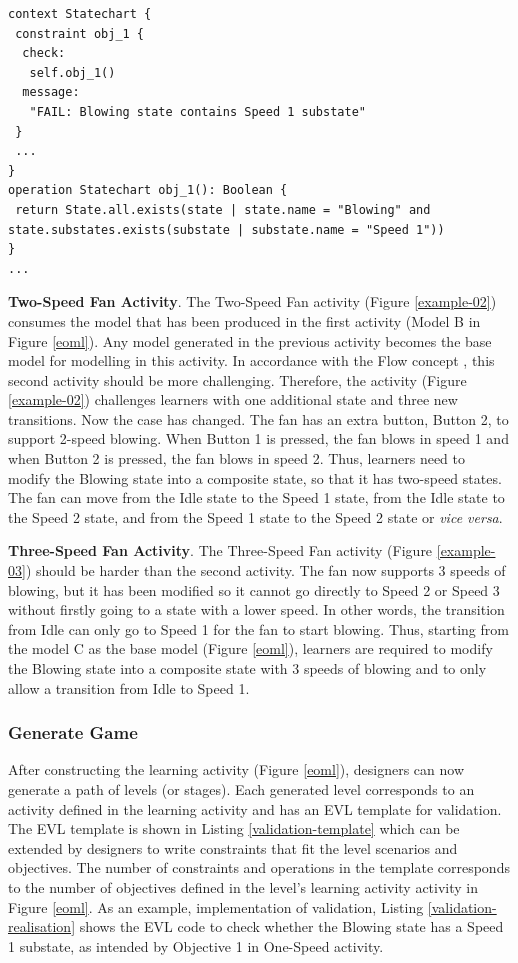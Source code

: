 \documentclass[10pt, a4paper]{report} \usepackage[titletoc]{appendix}
\begin{document}
\begin{lstlisting}[style=interfaces,caption={Validation realisation for Objective 1 in One-Speed Fan activity/level.}, label=validation-realisation]
context Statechart {
 constraint obj_1 {
  check: 
   self.obj_1()
  message:
   "FAIL: Blowing state contains Speed 1 substate"
 }
 ...
}
operation Statechart obj_1(): Boolean {
 return State.all.exists(state | state.name = "Blowing" and state.substates.exists(substate | substate.name = "Speed 1"))
}
...
\end{lstlisting} 

\textbf{Two-Speed Fan Activity}. The Two-Speed Fan activity (Figure \ref{example-02}) consumes the model that has been produced in the first activity (Model B in Figure \ref{eoml}). Any model generated in the previous activity becomes the base model for modelling in this activity. In accordance with the Flow concept \cite{csikszentmihalyi2014toward}, this second activity should be more challenging. Therefore, the activity (Figure \ref{example-02}) challenges learners with one additional state and three new transitions. Now the case has changed. The fan has an extra button, Button 2, to support 2-speed blowing. When Button 1 is pressed, the fan blows in speed 1 and when Button 2 is pressed, the fan blows in speed 2. Thus, learners need to modify the Blowing state into a composite state, so that it has two-speed states. The fan can move from the Idle state to the Speed 1 state, from the Idle state to the Speed 2 state, and from the Speed 1 state to the Speed 2 state or \textit{vice versa}.

\textbf{Three-Speed Fan Activity}. The Three-Speed Fan activity (Figure \ref{example-03}) should be harder than the second activity. The fan now supports 3 speeds of blowing, but it has been modified so it cannot go directly to Speed 2 or Speed 3 without firstly going to a state with a lower speed. In other words, the transition from Idle can only go to Speed 1 for the fan to start blowing. Thus, starting from the model C as the base model (Figure \ref{eoml}), learners are required to modify the Blowing state into a composite state with 3 speeds of blowing and to only allow a transition from Idle to Speed 1.

\subsubsection{Generate Game}
After constructing the learning activity (Figure \ref{eoml}), designers can now generate a path of levels (or stages). Each generated level corresponds to an activity defined in the learning activity and has an EVL template for validation. The EVL template is shown in Listing \ref{validation-template} which can be extended by designers to write constraints that fit the level scenarios and objectives. The number of constraints and operations in the template corresponds to the number of objectives defined in the level's learning activity activity in Figure \ref{eoml}. As an example, implementation of validation, Listing \ref{validation-realisation} shows the EVL code to check whether the Blowing state has a Speed 1 substate, as intended by Objective 1 in One-Speed activity. 
\end{document}
